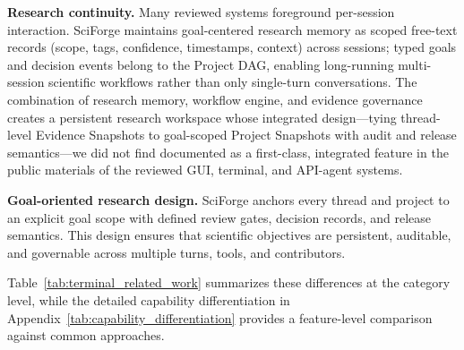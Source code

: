 \documentclass[sn-basic,Numbered,pdflatex]{sn-jnl}
\begin{document}
\textbf{Research continuity.} Many reviewed systems foreground per-session interaction. SciForge maintains goal-centered research memory as scoped free-text records (scope, tags, confidence, timestamps, context) across sessions; typed goals and decision events belong to the Project DAG, enabling long-running multi-session scientific workflows rather than only single-turn conversations. The combination of research memory, workflow engine, and evidence governance creates a persistent research workspace whose integrated design---tying thread-level Evidence Snapshots to goal-scoped Project Snapshots with audit and release semantics---we did not find documented as a first-class, integrated feature in the public materials of the reviewed GUI, terminal, and API-agent systems.

\textbf{Goal-oriented research design.} SciForge anchors every thread and project to an explicit goal scope with defined review gates, decision records, and release semantics. This design ensures that scientific objectives are persistent, auditable, and governable across multiple turns, tools, and contributors.

Table~\ref{tab:terminal_related_work} summarizes these differences at the category level, while the detailed capability differentiation in Appendix~\ref{tab:capability_differentiation} provides a feature-level comparison against common approaches.
\end{document}
